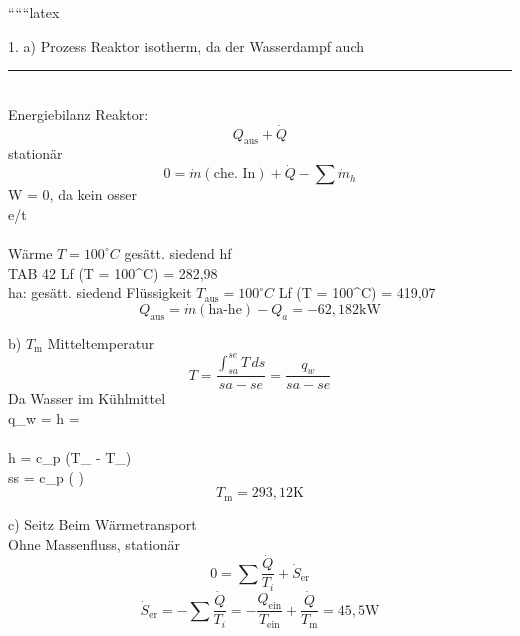 
``````latex


1. a) Prozess Reaktor isotherm, da der Wasserdampf auch \\
\hspace{1cm} \rule{5cm}{0.5pt} \\
Energiebilanz Reaktor: \\
\[
Q_{\text{aus}} + \dot{Q}
\]
stationär \\
\[
0 = \dot{m} (\text{che. In}) + \dot{Q} - \sum \dot{m}_h
\]
\hspace{1cm} W = 0, da kein osser \\
\hspace{1cm} \rightarrow {}e/t  \\
\hspace{1cm}  \\
Wärme $T = 100^\circ C$ \rightarrow gesätt. siedend \rightarrow hf \\
TAB 42 Lf (T = 100^\circ C) = 282,98  \\
\hspace{1cm} ha: \downarrow gesätt. siedend Flüssigkeit $T_{\text{aus}} = 100^\circ C$ Lf (T = 100^\circ C) = 419,07  \\
\[
Q_{\text{aus}} = \dot{m} (\text{ha-he}) - Q_a = -62,182 \text{kW}
\]

b) $T_{\text{m}}$ Mitteltemperatur \\
\[
T = \frac{\int_{sa}^{se} T \, ds}{sa-se} = \frac{q_w}{sa-se}
\]
Da Wasser im Kühlmittel \\
\hspace{1cm} \downarrow q_w = \Delta h \rightarrow {} =  \\
\hspace{1cm}  \\
\hspace{1cm} \rightarrow \Delta h = c_p (T_{} - T_{}) \\
\hspace{1cm} \rightarrow ss = c_p \ln \left(  \right) \\
\[
T_{\text{m}} = 293,12 \text{K}
\]

c) Seitz \rightarrow Beim Wärmetransport \\
\hspace{1cm} Ohne Massenfluss, stationär \\
\[
0 = \sum \frac{\dot{Q}}{T_i} + \dot{S}_{\text{er}}
\]
\[
\dot{S}_{\text{er}} = -\sum \frac{\dot{Q}}{T_i} = -\frac{Q_{\text{ein}}}{T_{\text{ein}}} + \frac{\dot{Q}}{T_{\text{m}}} = 45,5 \text{W}
\]

